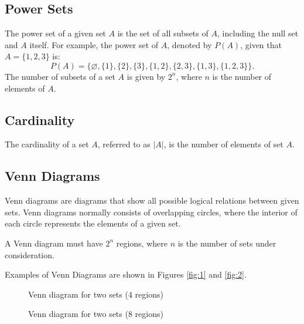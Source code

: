 \subsection*{Power Sets}
The power set of a given set $A$ is the set of all subsets of $A$, including the null set and $A$ itself. For example, the power set of $A$, denoted by $P(A)$, given that $A = \{1, 2, 3\}$ is:
\[P(A)=\{\varnothing,\{1\},\{2\},\{3\},\{1,2\},\{2,3\},\{1,3\},\{1,2,3\}\}.\]
The number of subsets of a set $A$ is given by $2^n$, where $n$ is the number of elements of $A$.

\subsection*{Cardinality}
The cardinality of a set $A$, referred to as $|A|$, is the number of elements of set $A$.

\subsection*{Venn Diagrams}
Venn diagrams are diagrams that show all possible logical relations between given sets. Venn diagrams normally consists of overlapping circles, where the interior of each circle represents the elements of a given set.

A Venn diagram must have $2^n$ regions, where $n$ is the number of sets under consideration.

Examples of Venn Diagrams are shown in Figures \eqref{fig:1} and \eqref{fig:2}.
\begin{figure}[h!]
\centering
\parbox[t][]{0.4\linewidth}{
\caption{Venn diagram for two sets (4 regions)}
\label{fig:1}
}
\qquad
\begin{minipage}[t]{0.4\linewidth}
\caption{Venn diagram for two sets (8 regions)}
\label{fig:2}
\end{minipage}
\end{figure}

